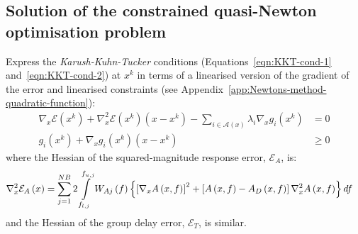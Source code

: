 \documentclass[a4paper,twoside,10pt,english]{report}
\begin{document}
\subsection{\label{sub:Solution-quasi-Newton-optimisation}Solution of the constrained quasi-Newton optimisation problem}
Express the \emph{Karush-Kuhn-Tucker} conditions (Equations~\ref{eqn:KKT-cond-1}
and~\ref{eqn:KKT-cond-2}) at $x^{k}$ in terms of a linearised version
of the gradient of the error and linearised constraints (see 
Appendix~\ref{app:Newtons-method-quadratic-function}):
\begin{align}
\nabla_{x}\mathcal{E}\left(x^{k}\right)+\nabla_{x}^{2}\mathcal{E}\left(x^{k}\right)\left(x-x^{k}\right)-\sum_{i\in\mathcal{A}\left(x\right)}\lambda_{i}\nabla_{x}g_{i}\left(x^{k}\right) &= 0\label{eqn:Linearised-KKT}\\
g_{i}\left(x^{k}\right)+\nabla_{x}g_{i}\left(x^{k}\right)\left(x-x^{k}\right) & \ge 0\nonumber 
\end{align}
where the Hessian of the squared-magnitude response error, $\mathcal{E}_{A}$, is:
\begin{align*}
\nabla_{x}^{2}\mathcal{E}_{A}\left(x\right) &= 
\sum_{j=1}^{NB}2\intop_{f_{l,j}}^{f_{u,j}}W_{Aj}\left(f\right)
\left\{ \left[\nabla_{x}A\left(x,f\right)\right]^{2}+
\left[A\left(x,f\right)-A_{D}\left(x,f\right)\right]
\nabla_{x}^{2}A\left(x,f\right)\right\} df
\end{align*}
and the Hessian of the group delay error, $\mathcal{E}_{T}$, is similar.
\end{document}
